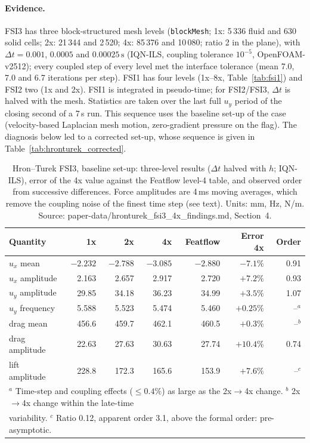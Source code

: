 \paragraph{Evidence.}
FSI3 has three block-structured mesh levels (\texttt{blockMesh}; 1x: 5\,336 fluid and 630 solid cells; 2x: 21\,344 and 2\,520; 4x: 85\,376 and 10\,080; ratio 2 in the plane), with $\Delta t = 0.001$, $0.0005$ and $0.00025\,\mathrm{s}$ (IQN-ILS, coupling tolerance $10^{-5}$, OpenFOAM-v2512); every coupled step of every level met the interface tolerance (mean 7.0, 7.0 and 6.7 iterations per step).
FSI1 has four levels (1x--8x, Table~\ref{tab:fsi1}) and FSI2 two (1x and 2x). FSI1 is integrated in pseudo-time; for FSI2/FSI3, $\Delta t$ is halved with the mesh.
Statistics are taken over the last full $u_y$ period of the closing second of a 7\,s run.
This sequence uses the baseline set-up of the case (velocity-based Laplacian mesh motion, zero-gradient pressure on the flag). The diagnosis below led to a corrected set-up, whose sequence is given in Table~\ref{tab:hronturek_corrected}.

\begin{table}[htbp]
	\centering
	\small
	\setlength{\tabcolsep}{4pt}
	\caption{Hron--Turek FSI3, baseline set-up: three-level results ($\Delta t$ halved with $h$; IQN-ILS), error of the 4x value against the Featflow level-4 table, and observed order from successive differences. Force amplitudes are 4\,ms moving averages, which remove the coupling noise of the finest time step (see text). Units: mm, Hz, N/m. Source: paper-data/hronturek\_fsi3\_4x\_findings.md, Section~4.}
	\label{tab:hronturek}
	\begin{tabular}{lrrrrrr}
		\toprule
		Quantity & 1x & 2x & 4x & Featflow & Error 4x & Order \\
		\midrule
		$u_x$ mean & $-2.232$ & $-2.788$ & $-3.085$ & $-2.880$ & $-7.1\%$ & 0.91 \\
		$u_x$ amplitude & 2.163 & 2.657 & 2.917 & 2.720 & $+7.2\%$ & 0.93 \\
		$u_y$ amplitude & 29.85 & 34.18 & 36.23 & 34.99 & $+3.5\%$ & 1.07 \\
		$u_y$ frequency & 5.588 & 5.523 & 5.474 & 5.460 & $+0.25\%$ & --$^a$ \\
		drag mean & 456.6 & 459.7 & 462.1 & 460.5 & $+0.3\%$ & --$^b$ \\
		drag amplitude & 22.63 & 27.63 & 30.63 & 27.74 & $+10.4\%$ & 0.74 \\
		lift amplitude & 228.8 & 172.3 & 165.6 & 153.9 & $+7.6\%$ & --$^c$ \\
		\bottomrule
		\multicolumn{7}{l}{\footnotesize $^a$ Time-step and coupling effects ($\leq0.4\%$) as large as the 2x$\to$4x change. $^b$ 2x$\to$4x change within the late-time} \\
		\multicolumn{7}{l}{\footnotesize variability. $^c$ Ratio 0.12, apparent order 3.1, above the formal order: pre-asymptotic.}
	\end{tabular}
\end{table}

